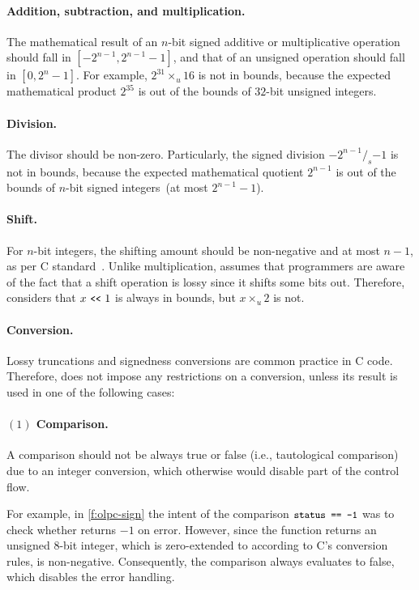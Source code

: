 \paragraph{Addition, subtraction, and multiplication.}
The mathematical result of an $n$-bit signed additive or multiplicative
operation should fall in $[-2^{n-1}, 2^{n-1}-1]$,
and that of an unsigned operation should fall in
$[0, 2^{n}-1]$.
For example,
$2^{31}\times_u 16$ is not in bounds,
because the expected mathematical product $2^{35}$ is out of the bounds
of $32$-bit unsigned integers.

\paragraph{Division.}
The divisor should be non-zero.  Particularly, the signed division
$-2^{n-1} /_s {-1}$ is not in bounds, because the expected mathematical
quotient $2^{n-1}$ is out of the bounds of $n$-bit signed integers~(at
most $2^{n-1}-1$).

\paragraph{Shift.}
For $n$-bit integers, the shifting amount should be non-negative
and at most $n-1$, as per C standard~\cite[\subsectionautorefname~6.5.7]{c11}.
%
Unlike multiplication, \sys assumes that programmers are aware of
the fact that a shift operation is lossy since it shifts some bits
out.  Therefore, \sys considers that $x \shl 1$ is always in bounds, but
$x \times_u 2$ is not.

\paragraph{Conversion.}
Lossy truncations and signedness conversions are common practice in
C code.  Therefore,
\sys does not impose any restrictions on a conversion,
unless its result is used in one of the following cases:

\paragraph{$(1)$ Comparison.}
A comparison should not be always true or false (i.e., tautological
comparison) due to an integer conversion, which otherwise would
disable part of the control flow.

For example, in \autoref{f:olpc-sign} the intent of the comparison
$\cc{status == -1}$ was to check whether  returns
${-1}$ on error.  However, since the function returns an unsigned 8-bit
integer, which is zero-extended to  according to C's
conversion rules,  is non-negative.  Consequently,
the comparison always evaluates to false, which disables the error
handling.

